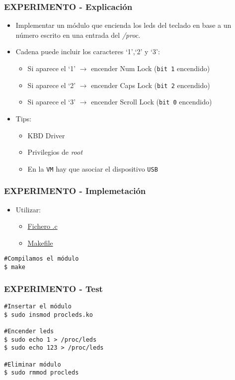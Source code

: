 \begin{frame}
\frametitle{EXPERIMENTO - Explicación}
   \begin{itemize}  
   \item Implementar un módulo que encienda los leds del teclado en base a un número escrito en una entrada del \emph{/proc}.
   \item Cadena puede incluir los caracteres ‘1’,‘2’ y ‘3’:
   \begin{itemize}
      \item Si aparece el ‘1’ $\rightarrow$ encender Num Lock (\texttt{bit 1} encendido)
      \item Si aparece el ‘2’ $\rightarrow$ encender Caps Lock (\texttt{bit 2} encendido)
      \item Si aparece el ‘3’ $\rightarrow$ encender Scroll Lock (\texttt{bit 0} encendido)
    \end{itemize}
   \item Tips:
   \begin{itemize}     
      \item KBD Driver
      \item Privilegios de \emph{root}
      \item En la \texttt{VM} hay que asociar el dispositivo \texttt{USB}
    \end{itemize}
 \end{itemize}
\end{frame}

\begin{frame}[fragile]
\frametitle{EXPERIMENTO - Implemetación}
  \begin{itemize}
    \item Utilizar:
       \begin{itemize}
          \item \href{https://github.com/unlp-so/contenidos/blob/master/explicaciones/so/practica3/experiment/procleds.c}{Fichero .c}
          \item \href{https://github.com/unlp-so/contenidos/blob/master/explicaciones/so/practica3/experiment/Makefile}{Makefile}
       \end{itemize}
  \end{itemize}
  \begin{lstlisting}
#Compilamos el módulo
$ make
  \end{lstlisting}
\end{frame}

\begin{frame}[fragile]
\frametitle{EXPERIMENTO - Test}
  \begin{lstlisting}
#Insertar el módulo
$ sudo insmod procleds.ko

#Encender leds
$ sudo echo 1 > /proc/leds
$ sudo echo 123 > /proc/leds

#Eliminar módulo
$ sudo rmmod procleds
  \end{lstlisting}
\end{frame}